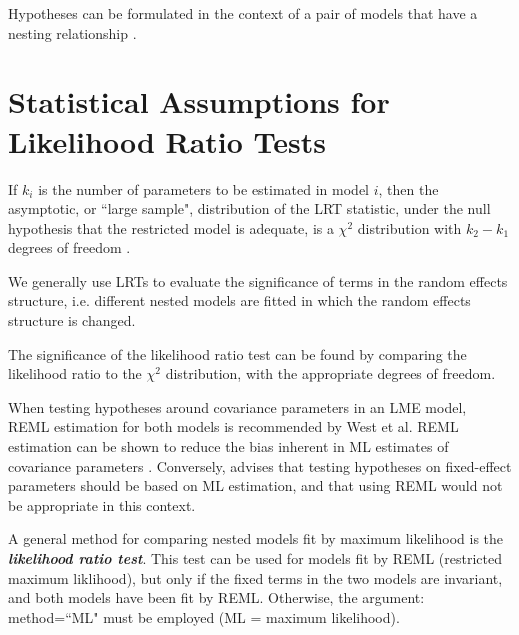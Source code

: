 \documentclass[12pt, a4paper]{report}
\theoremstyle{plain}
\theoremstyle{definition}
\theoremstyle{remark}
\begin{document}
Hypotheses can be formulated in the context of a pair of models that have a nesting relationship \citet{west}.






%
%



\section{Statistical Assumptions for Likelihood Ratio Tests}


If $k_i$ is the number of parameters to be estimated in model $i$, then the asymptotic, or ``large sample", distribution of the LRT statistic, under the null hypothesis that the restricted model is adequate, is a $\chi^2$ distribution with $k_2-k_1$ degrees of freedom \citep[pg.83]{pb}.

We generally use LRTs to evaluate the significance of terms in the random effects structure, i.e. different nested models are fitted in which the random effects structure is changed.

The significance of the likelihood ratio test can be found by comparing the likelihood ratio to the $\chi^2$ distribution, with the appropriate degrees of freedom.

When testing hypotheses around covariance parameters in an LME model, REML estimation for both models is recommended by West et al. REML estimation can be shown to reduce the bias inherent in ML estimates of covariance parameters \citep{west}. Conversely, \citet{pb} advises that testing hypotheses on fixed-effect parameters should be based on ML estimation, and that using REML would not be appropriate in this context.







A general method for comparing nested models fit by maximum likelihood is the \textbf{\emph{likelihood ratio test}}. This test can be used for models fit by REML (restricted maximum liklihood), but only if the fixed terms in the two models are invariant, and both models have been fit by REML. Otherwise, the argument: method=``ML" must be employed (ML = maximum likelihood).
\end{document}
